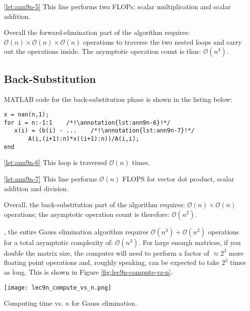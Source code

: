 \noindent \ref{lst:ann9n-5} This line performs two FLOPs: scalar multiplication and scalar addition.

\vspace{0.25cm}

\noindent Overall the forward-elimination part of the algorithm requires: $\mathcal{O}(n) \times \mathcal{O}(n) \times \mathcal{O}(n)$ operations to traverse the two nested loops and carry out the operations inside. The asymptotic operation count is thus: $\mathcal{O}(n^3)$.

\subsection{Back-Substitution}
MATLAB code for the back-substitution phase is shown in the listing below:
\begin{lstlisting}[style=myMatlab]
x = nan(n,1); 
for i = n:-1:1    /*!\annotation{lst:ann9n-6}!*/
   x(i) = (b(i) - ...    /*!\annotation{lst:ann9n-7}!*/
       A(i,(i+1):n)*x((i+1):n))/A(i,i);    
end
\end{lstlisting}

\vspace{0.25cm}

\noindent \ref{lst:ann9n-6} This loop is traversed $\mathcal{O}(n)$ times.

\vspace{0.25cm}

\noindent \ref{lst:ann9n-7} This line performs $\mathcal{O}(n)$ FLOPS for vector dot product, scalar addition and division.

\vspace{0.25cm} 

\noindent Overall, the back-substitution part of the algorithm requires: $\mathcal{O}(n) \times \mathcal{O}(n)$ operations; the asymptotic operation count is therefore: $\mathcal{O}(n^2)$.

\vspace{4.25cm}

, the entire Gauss elimination algorithm requires $\mathcal{O}(n^3) + \mathcal{O}(n^2)$ operations for a total asymptotic complexity of: $\mathcal{O}(n^3)$.  For large enough matrices, if you double the matrix size, the computer will need to perform a factor of $\approx 2^3$ more floating point operations and, roughly speaking, can be expected to take $2^{3}$ times as long. This is shown in Figure \ref{fig:lec9n-compute-vs-n}.
\begin{marginfigure}
\texttt{[image: lec9n\_compute\_vs\_n.png]}
\caption{Computing time vs. $n$ for Gauss elimination.}
\label{fig:lec9n-compute-vs-n}
\end{marginfigure}


